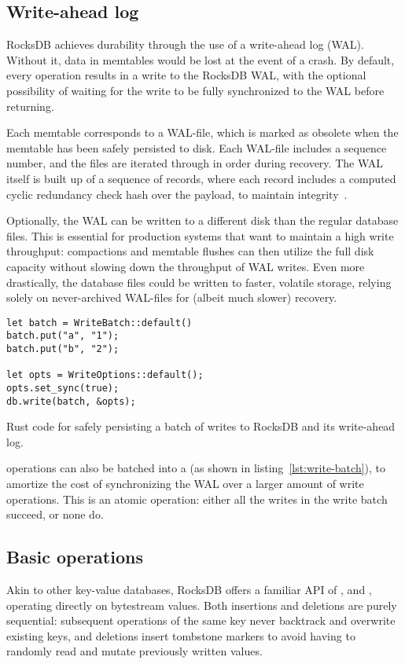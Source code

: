 \subsection{Write-ahead log}\label{sec:rocksdb-wal}
RocksDB achieves durability through the use of a write-ahead log (WAL). Without
it, data in memtables would be lost at the event of a crash. By default, every
 operation results in a write to the RocksDB WAL, with the optional
possibility of waiting for the write to be fully synchronized to the WAL before
returning.

Each memtable corresponds to a WAL-file, which is marked as obsolete when the
memtable has been safely persisted to disk. Each WAL-file includes a sequence
number, and the files are iterated through in order during recovery. The WAL
itself is built up of a sequence of records, where each record includes a
computed cyclic redundancy check hash over the payload, to maintain
integrity~\cite{rocksdb-wal}.

Optionally, the WAL can be written to a different disk than the regular database
files. This is essential for production systems that want to maintain a high
write throughput: compactions and memtable flushes can then utilize the full
disk capacity without slowing down the throughput of WAL writes. Even more
drastically, the database files could be written to faster, volatile storage,
relying solely on never-archived WAL-files for (albeit much slower) recovery.

\begin{listing}[H]
  \begin{verbatim}
let batch = WriteBatch::default()
batch.put("a", "1");
batch.put("b", "2");

let opts = WriteOptions::default();
opts.set_sync(true);
db.write(batch, &opts);
  \end{verbatim}

  \caption{Rust code for safely persisting a batch of writes to RocksDB and its
  write-ahead log.}\label{lst:write-batch}
\end{listing}

 operations can also be batched into a  (as shown in
listing~\ref{lst:write-batch}), to amortize the cost of synchronizing the WAL
over a larger amount of write operations. This is an atomic operation: either
all the writes in the write batch succeed, or none do.

\subsection{Basic operations}
Akin to other key-value databases, RocksDB offers a familiar API of
,  and , operating
directly on bytestream values. Both insertions and deletions are purely
sequential: subsequent  operations of the same key never backtrack and
overwrite existing keys, and deletions insert tombstone markers to avoid having
to randomly read and mutate previously written values.

